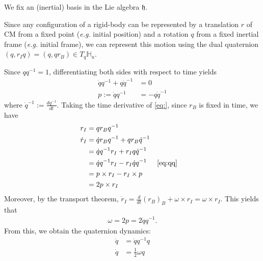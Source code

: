 \documentclass[12pt,class=article,crop=false]{standalone}
\begin{document}
We fix an (inertial) basis in the Lie algebra $ \mathfrak{ h}$. 

Since any configuration of a rigid-body can be represented by a translation $ r$ of CM from a fixed point (\emph{e.g.} initial position) and a rotation $ q$ from a fixed inertial frame (\emph{e.g.} initial frame), we can represent this motion using the dual quaternion $ (q, r_I q) = (q,q r_B) \in T_q \mathbb{H}_u$.

Since $ q q^{-1} = 1$, differentiating both sides with respect to time yields
\begin{align}
	\dot{q}q^{-1} + q \dot{q}^{-1} &= 0 \\
	p:= \dot{q}q^{-1} &=- q \dot{q}^{-1}\label{eq:qq}
\end{align}
where $ \dot{q}^{-1} := \frac{d q^{-1}}{d t} $. Taking the time derivative of \cref{eq:}, since $ r_B$ is fixed in time, we have
\begin{align*}
	r_I &= q r_B q^{-1} \\
	\dot{r}_I &= \dot{q} r_B q^{-1} + q r_B \dot{q}^{-1} \\
	&= \dot{q} q^{-1} r_I + r_I q \dot{q}^{-1} \\
	&= \dot{q}q^{-1} r_I - r_I \dot{q} q^{-1} && \cref{eq:qq}\\
	&= p \times r_I - r_I \times p \\
	&= 2 p \times r_I
\end{align*}
Moreover, by the transport theorem, $ \dot{r}_I = \frac{d}{d t}\left( r_B \right)_B   + \omega \times r_I = \omega \times r_I$. This yields that
\begin{align} \label{eq:omega}
	\omega = 2p = 2 \dot{q} q^{-1} .
\end{align}
From this, we obtain the quaternion dynamics:
\begin{align}
	\dot{q} &=  \dot{q} q^{-1} q \\
	\dot{q}&= \frac{1}{2} \omega q
\end{align}
\end{document}
